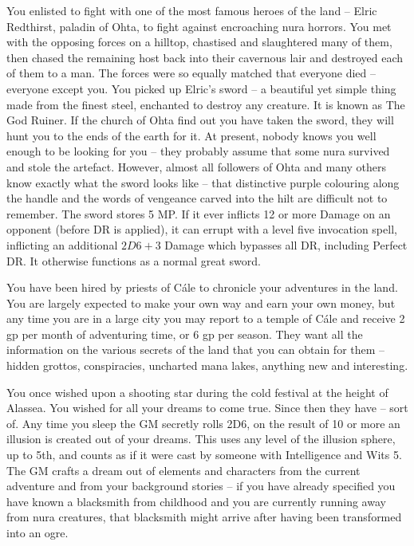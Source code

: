 \begin{multicols}{2}
\begin{list}{\addtocounter{list}{1}\textbf{:}}{\raggedleft}
\item{You enlisted to fight with one of the most famous heroes of the land -- Elric Redthirst, paladin of Ohta, to fight against encroaching nura horrors.  You met with the opposing forces on a hilltop, chastised and slaughtered many of them, then chased the remaining host back into their cavernous lair and destroyed each of them to a man.  The forces were so equally matched that everyone died -- everyone except you. You picked up Elric's sword -- a beautiful yet simple thing made from the finest steel, enchanted to destroy any creature.  It is known as The God Ruiner.  If the church of Ohta find out you have taken the sword, they will hunt you to the ends of the earth for it.  At present, nobody knows you well enough to be looking for you -- they probably assume that some nura survived and stole the artefact.  However, almost all followers of Ohta and many others know exactly what the sword looks like -- that distinctive purple colouring along the handle and the words of vengeance carved into the hilt are difficult not to remember.  The sword stores 5 MP.  If it ever inflicts 12 or more Damage on an opponent (before DR is applied), it can errupt with a level five invocation spell, inflicting an additional $2D6+3$ Damage which bypasses all DR, including Perfect DR.  It otherwise functions as a normal great sword.}

\item{You have been hired by priests of C\'{a}le to chronicle your adventures in the land.  You are largely expected to make your own way and earn your own money, but any time you are in a large city you may report to a temple of C\'{a}le and receive 2 gp per month of adventuring time, or 6 gp per season.  They want all the information on the various secrets of the land that you can obtain for them -- hidden grottos, conspiracies, uncharted mana lakes, anything new and interesting.}

\item{You once wished upon a shooting star during the cold festival at the height of Alassea. You wished for all your dreams to come true.  Since then they have -- sort of.  Any time you sleep the GM secretly rolls 2D6, on the result of 10 or more an illusion is created out of your dreams.  This uses any level of the illusion sphere, up to 5th, and counts as if it were cast by someone with Intelligence and Wits 5.  The GM crafts a dream out of elements and characters from the current adventure and from your background stories -- if you have already specified you have known a blacksmith from childhood and you are currently running away from nura creatures, that blacksmith might arrive after having been transformed into an ogre.}


\end{list}
\end{multicols}
